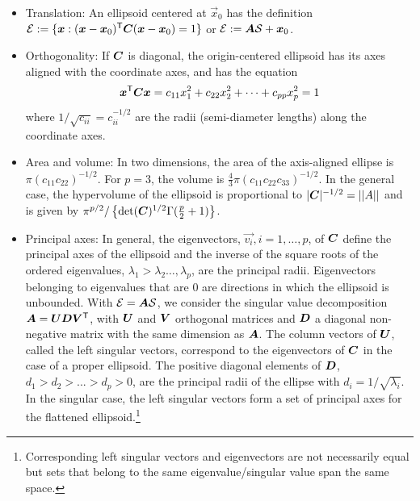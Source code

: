 \begin{itemize}
 \item Translation: An ellipsoid centered at $\vec{x}_0$ has the definition $\mathcal{E} := \{ \bm{x}: (\bm{x}-\bm{x}_0)^\mathsf{T} \bm{C} (\bm{x}-\bm{x}_0) =1 \}$ or $\mathcal{E} := \bm{A} \mathcal{S} + \bm{x}_0$.

 \item Orthogonality: If $\bm{C}$ is diagonal, the origin-centered ellipsoid has its axes aligned with the coordinate axes, and
has the equation
\begin{equation}\label{eq:ellisoid2}
 \bm{x}^\mathsf{T} \bm{C} \bm{x} = c_{11} x_1^2 + c_{22} x_2^2 + \cdots + c_{pp} x_p^2 =1
\end{equation}
where $1/\sqrt{c_{ii}} = c_{ii}^{-1/2}$ are the radii (semi-diameter lengths) along the coordinate axes.

 \item Area and volume: In two dimensions, the area of the axis-aligned ellipse is $\pi (c_{11} c_{22})^{-1/2}$.
 For $p=3$, the volume is $\frac{4}{3}\pi (c_{11} c_{22} c_{33})^{-1/2}$.
 In the general case, the hypervolume of the ellipsoid is proportional to $|\bm{C}|^{-1/2}=||A||$
 and is given by $\pi^{p/2} / \left\{ \mathrm{det} (\bm{C})^{1/2} \Gamma(\frac{p}{2}+1) \right\}$.

 \item Principal axes: In general, the eigenvectors, $\vec{v_i}, i=1,\dots,p$,
of $\bm{C}$ define the principal axes of the ellipsoid and
the inverse of the square roots of the ordered
eigenvalues, $\lambda_1 > \lambda_2 \dots, \lambda_p$, are the principal radii. 
Eigenvectors belonging to eigenvalues that are 0 are directions in which the ellipsoid is unbounded. 
With $\mathcal{E} = \bm{A} \mathcal{S}$, we consider the singular value decomposition 
$  \bm{A}= \bm{U} \bm{D} \bm{V} ^\mathsf{T}$, 
with $\bm{U}$ and  $\bm{V}$ orthogonal matrices and  $\bm{D}$  a diagonal non-negative matrix 
with the same dimension as $\bm{A}$. 
The column vectors of $\bm{U}$, called the left singular vectors, 
correspond to the eigenvectors of $\bm{C}$ in the case of a proper ellipsoid. 
The positive diagonal elements of $\bm{D}$, $d_1 > d_2 > ... > d_p>0$, 
are the principal radii of the ellipse with $d_i = 1/\sqrt{\lambda_i}$.  
In the singular case, the left singular vectors form a set of principal axes for the flattened ellipsoid.\footnote{Corresponding left singular vectors and eigenvectors are not necessarily equal but sets that belong to the same eigenvalue/singular value span the same space.}


\end{itemize}
